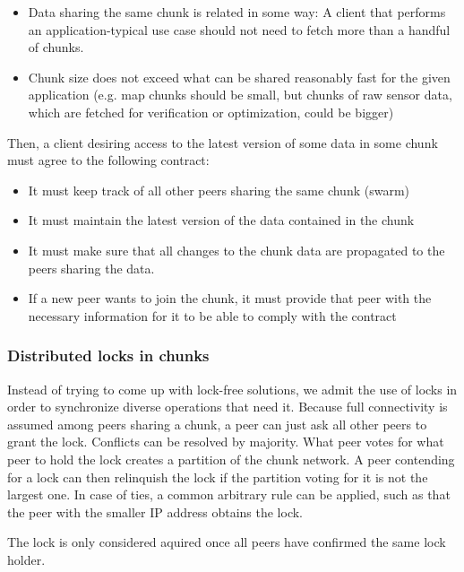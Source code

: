 \documentclass{article}
\begin{document}
\begin{itemize}
  \itemsep0em
  \item Data sharing the same chunk is related in some way: A client that
    performs an application-typical use case should not need to fetch more than
    a handful of chunks.
  \item Chunk size does not exceed what can be shared reasonably fast for the
    given application (e.g. map chunks should be small, but chunks of raw
    sensor data, which are fetched for verification or optimization, 
    could be bigger)
\end{itemize}

Then, a client desiring access to the latest version of some data in some chunk
must agree to the following contract:

\begin{itemize}
  \itemsep0em
  \item It must keep track of all other peers sharing the same chunk (swarm)
  \item It must maintain the latest version of the data contained in the chunk
  \item It must make sure that all changes to the chunk data are propagated to
    the peers sharing the data.
  \item If a new peer wants to join the chunk, it must provide that peer with
    the necessary information for it to be able to comply with the contract
\end{itemize}

\subsubsection{Distributed locks in chunks}

Instead of trying to come up with lock-free solutions, we admit the use of
locks in order to synchronize diverse operations that need it. Because full
connectivity is assumed among peers sharing a chunk, a peer can just ask all
other peers to grant the lock. Conflicts can be resolved by majority. What peer
votes for what peer to hold the lock creates a partition of the chunk network.
A peer contending for a lock can then relinquish the lock if the partition 
voting for it is not the largest one. In case of ties, a common arbitrary rule
can be applied, such as that the peer with the smaller IP address obtains the
lock.

The lock is only considered aquired once all peers have confirmed the same lock
holder.
\end{document}
